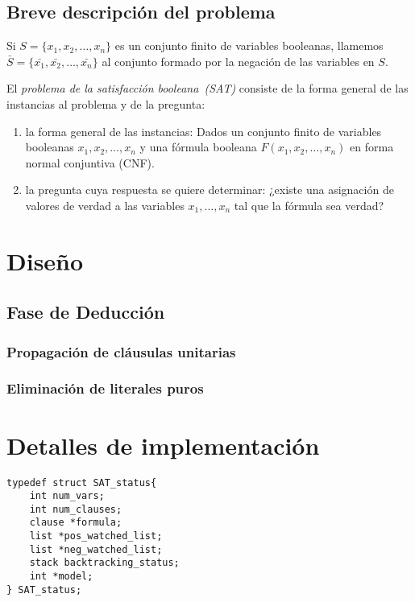 \documentclass[12pt,lettersize]{article}
\begin{document}
\subsection{Breve descripción del problema} 
Si $S=\{x_1,x_2,\ldots,x_n\}$ es un conjunto finito de variables booleanas,
llamemos $\bar{S}=\{\bar{x_1},\bar{x_2},\ldots,\bar{x_n}\}$ al conjunto formado
por la negación de las variables en $S$. 

El \emph{problema de la satisfacción booleana~(SAT)} consiste de la forma
general de las instancias al problema y de la pregunta:
\vspace{-2.5mm}
\begin{enumerate}
\item la forma general de las instancias: Dados un conjunto finito de variables
booleanas $x_1,x_2,\ldots,x_n$ y una fórmula booleana
$F(x_1,x_2,\ldots,x_n)$ en forma normal
conjuntiva (CNF).
\item la pregunta cuya respuesta se quiere determinar: ¿existe una asignación de valores de verdad a las
variables $x_1,\ldots, x_n$ tal que la fórmula sea verdad?
\end{enumerate}

\section{Diseño}

\subsection{Fase de Deducción}

\subsubsection{Propagación de cláusulas unitarias}

\subsubsection{Eliminación de literales puros}

\section{Detalles de implementación}


\begin{lstlisting}
typedef struct SAT_status{    
    int num_vars;
    int num_clauses;
    clause *formula;
    list *pos_watched_list;
    list *neg_watched_list;
    stack backtracking_status;
    int *model;                     
} SAT_status;
\end{lstlisting}
\end{document}
